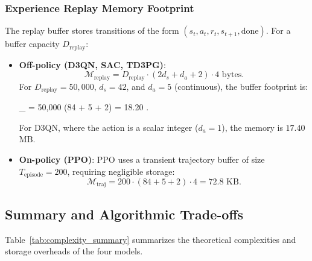 \subsubsection{Experience Replay Memory Footprint}
The replay buffer stores transitions of the form $(s_t, a_t, r_t, s_{t+1}, \text{done})$. For a buffer capacity $D_{\text{replay}}$:
\begin{itemize}
    \item \textbf{Off-policy (D3QN, SAC, TD3PG)}:
    \begin{equation}
        \mathcal{M}_{\text{replay}} = D_{\text{replay}} \cdot \left( 2 d_s + d_a + 2 \right) \cdot 4 \text{ bytes}.
    \end{equation}
    For $D_{\text{replay}} = 50,000$, $d_s = 42$, and $d_a = 5$ (continuous), the buffer footprint is:
    \begin{equation{}}
        _{} = 50,000 \cdot (84 + 5 + 2)  = 18.20 .
    \end{equation{}}
    For D3QN, where the action is a scalar integer ($d_a = 1$), the memory is $17.40$ MB.
    
    \item \textbf{On-policy (PPO)}: PPO uses a transient trajectory buffer of size $T_{\text{episode}} = 200$, requiring negligible storage:
    \begin{equation}
        \mathcal{M}_{\text{traj}} = 200 \cdot (84 + 5 + 2) \cdot 4 = 72.8 \text{ KB}.
    \end{equation}
\end{itemize}

\subsection{Summary and Algorithmic Trade-offs}
Table~\ref{tab:complexity_summary} summarizes the theoretical complexities and storage overheads of the four models.

